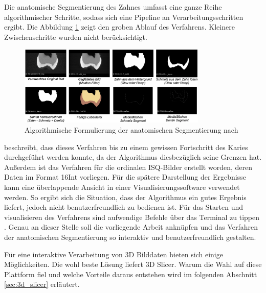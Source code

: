 Die anatomische Segmentierung des Zahnes umfasst eine ganze Reihe algorithmischer
Schritte, sodass sich eine Pipeline an Verarbeitungsschritten ergibt. Die Abbildung
\ref{fig:anatomische_segmentierung} zeigt den groben Ablauf des Verfahrens.
Kleinere Zwischenschritte wurden nicht berücksichtigt.

\begin{figure}[h]
	\centering
	\includegraphics[width=0.8\textwidth]{img/anatomischeSegmentierung.png}
	\caption{Algorithmische Formulierung der anatomischen Segmentierung nach
	\citet{hoffmann2020}}
	\label{fig:anatomische_segmentierung}
\end{figure}

\citet[S.~55]{hoffmann2020} beschreibt, dass dieses Verfahren bis zu einem gewissen
Fortschritt des Karies durchgeführt werden konnte, da der Algorithmus
diesbezüglich seine Grenzen hat. Außerdem ist das Verfahren für die ordinalen \ac{ISQ}-Bilder
erstellt worden, deren Daten im Format \ac{16Int} vorliegen. Für die spätere Darstellung
der Ergebnisse kann eine überlappende Ansicht in einer Visualisierungssoftware verwendet
werden. So ergibt sich die Situation, dass der Algorithmus ein gutes Ergebnis liefert,
jedoch nicht benutzerfreundlich zu bedienen ist. Für das Starten und visualisieren
des Verfahrens sind aufwendige Befehle über das Terminal zu tippen \citep[vgl.][S.~53]{hoffmann2020}.
Genau an dieser Stelle soll die vorliegende Arbeit anknüpfen und das Verfahren der
anatomischen Segmentierung so interaktiv und benutzerfreundlich gestalten.

Für eine interaktive Verarbeitung von 3D Bilddaten bieten sich einige Möglichkeiten.
Die wohl beste Lösung liefert 3D Slicer. Warum die Wahl auf diese Plattform fiel
und welche Vorteile daraus entstehen wird im folgenden Abschnitt \ref{sec:3d_slicer}
erläutert.

